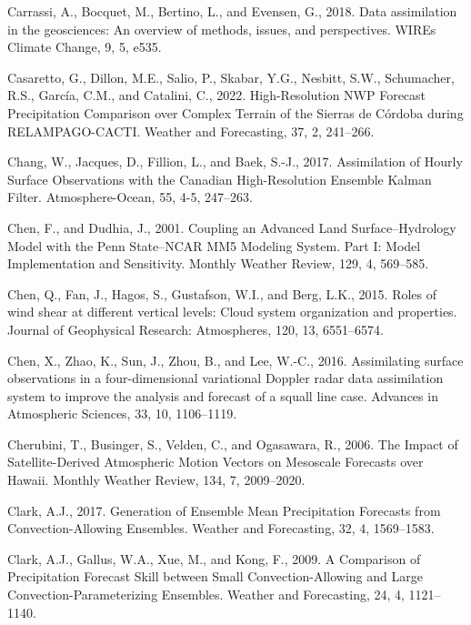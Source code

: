 \documentclass[12pt,oneside,a4paper]{reedthesis}
\begin{document}
\leavevmode\hypertarget{ref-carrassi2018}{}%
Carrassi, A., Bocquet, M., Bertino, L., and Evensen, G., 2018. Data assimilation in the geosciences: An overview of methods, issues, and perspectives. WIREs Climate Change, 9, 5, e535.

\leavevmode\hypertarget{ref-casaretto2022}{}%
Casaretto, G., Dillon, M.E., Salio, P., Skabar, Y.G., Nesbitt, S.W., Schumacher, R.S., García, C.M., and Catalini, C., 2022. High-Resolution NWP Forecast Precipitation Comparison over Complex Terrain of the Sierras de Córdoba during RELAMPAGO-CACTI. Weather and Forecasting, 37, 2, 241--266.

\leavevmode\hypertarget{ref-chang2017}{}%
Chang, W., Jacques, D., Fillion, L., and Baek, S.-J., 2017. Assimilation of Hourly Surface Observations with the Canadian High-Resolution Ensemble Kalman Filter. Atmosphere-Ocean, 55, 4-5, 247--263.

\leavevmode\hypertarget{ref-chen2001}{}%
Chen, F., and Dudhia, J., 2001. Coupling an Advanced Land Surface--Hydrology Model with the Penn State--NCAR MM5 Modeling System. Part I: Model Implementation and Sensitivity. Monthly Weather Review, 129, 4, 569--585.

\leavevmode\hypertarget{ref-chen2015}{}%
Chen, Q., Fan, J., Hagos, S., Gustafson, W.I., and Berg, L.K., 2015. Roles of wind shear at different vertical levels: Cloud system organization and properties. Journal of Geophysical Research: Atmospheres, 120, 13, 6551--6574.

\leavevmode\hypertarget{ref-chen2016}{}%
Chen, X., Zhao, K., Sun, J., Zhou, B., and Lee, W.-C., 2016. Assimilating surface observations in a four-dimensional variational Doppler radar data assimilation system to improve the analysis and forecast of a squall line case. Advances in Atmospheric Sciences, 33, 10, 1106--1119.

\leavevmode\hypertarget{ref-cherubini2006}{}%
Cherubini, T., Businger, S., Velden, C., and Ogasawara, R., 2006. The Impact of Satellite-Derived Atmospheric Motion Vectors on Mesoscale Forecasts over Hawaii. Monthly Weather Review, 134, 7, 2009--2020.

\leavevmode\hypertarget{ref-clark2017}{}%
Clark, A.J., 2017. Generation of Ensemble Mean Precipitation Forecasts from Convection-Allowing Ensembles. Weather and Forecasting, 32, 4, 1569--1583.

\leavevmode\hypertarget{ref-clark2009}{}%
Clark, A.J., Gallus, W.A., Xue, M., and Kong, F., 2009. A Comparison of Precipitation Forecast Skill between Small Convection-Allowing and Large Convection-Parameterizing Ensembles. Weather and Forecasting, 24, 4, 1121--1140.
\end{document}
